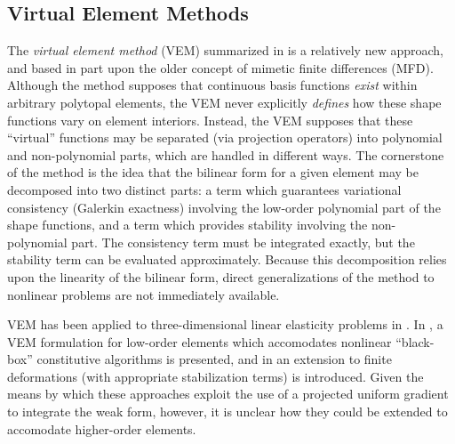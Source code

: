 	\subsection{Virtual Element Methods}
		The \textit{virtual element method} (VEM) summarized in \cite{Veiga:13} is a relatively new approach, and based in part upon the older concept of mimetic finite differences (MFD). Although the method supposes that continuous basis functions \textit{exist} within arbitrary polytopal elements, the VEM never explicitly \textit{defines} how these shape functions vary on element interiors. Instead, the VEM supposes that these ``virtual'' functions may be separated (via projection operators) into polynomial and non-polynomial parts, which are handled in different ways. The cornerstone of the method is the idea that the bilinear form for a given element may be decomposed into two distinct parts: a term which guarantees variational consistency (Galerkin exactness) involving the low-order polynomial part of the shape functions, and a term which provides stability involving the non-polynomial part. The consistency term must be integrated exactly, but the stability term can be evaluated approximately. Because this decomposition relies upon the linearity of the bilinear form, direct generalizations of the method to nonlinear problems are not immediately available.
		
		VEM has been applied to three-dimensional linear elasticity problems in \cite{Gain:13}. In \cite{Veiga:15}, a VEM formulation for low-order elements which accomodates nonlinear ``black-box'' constitutive algorithms is presented, and in \cite{Chi:17} an extension to finite deformations (with appropriate stabilization terms) is introduced. Given the means by which these approaches exploit the use of a projected uniform gradient to integrate the weak form, however, it is unclear how they could be extended to accomodate higher-order elements.
		
